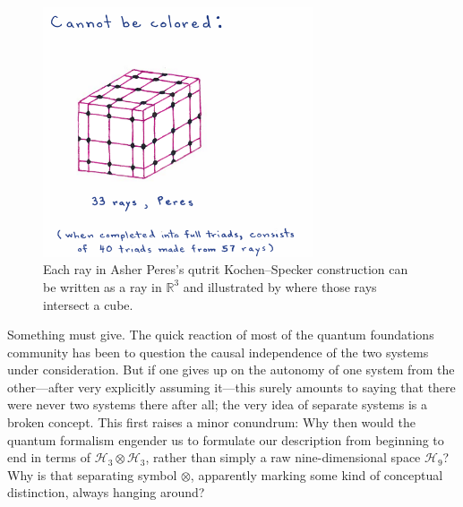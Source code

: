 \documentclass[aps,pra,superscriptaddress,12pt,tightenlines,nofootinbib]{revtex4-2}
\begin{document}
\begin{figure}[ht]
\begin{center}
\includegraphics[width=8cm]{peres.png}
\end{center}
\caption{\label{fig:peres} Each ray in Asher Peres's qutrit Kochen--Specker construction can be written as a ray in $\mathbb{R}^3$ and illustrated by where those rays intersect a cube.}
\end{figure}

Something must give.  The quick reaction of most of the quantum foundations community has been to question the causal independence of the two systems under consideration.  But if one gives up on the autonomy of one system from the other---after very explicitly assuming it---this surely amounts to saying that there were never two systems there after all; the very idea of separate systems is a broken concept.  This first raises a minor conundrum:  Why then would the quantum formalism engender us to formulate our description from beginning to end in terms of ${\mathcal H}_3\otimes{\mathcal H}_3$, rather than simply a raw nine-dimensional space ${\mathcal H}_{9}$?  Why is that separating symbol $\otimes$, apparently marking some kind of conceptual distinction, always hanging around?
\end{document}
